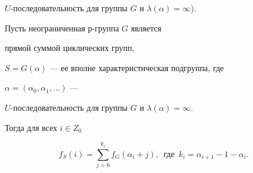 $U$-последовательность для группы $G$ и $\lambda(\alpha)=\infty$).





\begin{thms}


Пусть неограниченная $р$-группа $G$ является


прямой суммой циклических групп,


$S=G(\alpha)$ --- ее вполне характеристическая подгруппа, где


$\alpha=(\alpha_0,\alpha_1,\dotsc)$ ---


$U$-последовательность для группы $G$ и $\lambda(\alpha)=\infty$.


Тогда для всех $i\in Z_0$


\begin{equation}


f_S(i)=\sum\limits_{j=0}^{k_i}f_G(\alpha_i+j),\ \; \text{где}\ \;


k_i=\alpha_{i+1}-1-\alpha_i.


\end{equation}


\end{thms}





